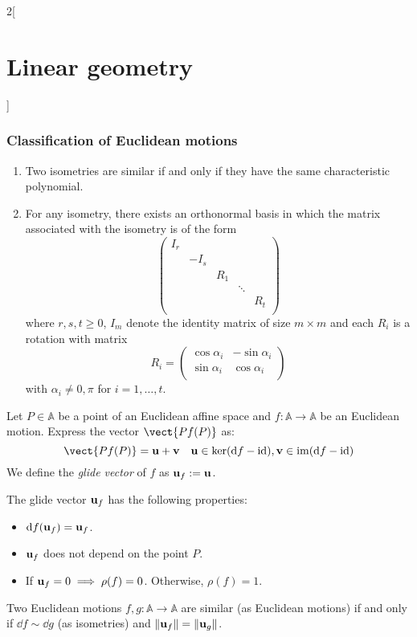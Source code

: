 \documentclass[../../../main.tex]{subfiles}
\begin{document}
\begin{multicols}{2}[\section{Linear geometry}]
  \subsubsection{Classification of Euclidean motions}
  \begin{theorem}
    \hfill
    \begin{enumerate}
      \item Two isometries are similar if and only if they have the same characteristic polynomial.
      \item For any isometry, there exists an orthonormal basis in which the matrix associated with the isometry is of the form  $$\begin{pmatrix}
                I_r &      &     &        &     \\
                    & -I_s &     &        &     \\
                    &      & R_1 &        &     \\
                    &      &     & \ddots &     \\
                    &      &     &        & R_t \\
              \end{pmatrix}$$ where $r,s,t\geq 0$, $I_m$ denote the identity matrix of size $m\times m$ and each $R_i$ is a rotation with matrix $$R_i=\begin{pmatrix}
                \cos\alpha_i & -\sin\alpha_i \\
                \sin\alpha_i & \cos\alpha_i  \\
              \end{pmatrix}$$ with $\alpha_i\ne0,\pi$ for $i=1,\ldots,t$.
    \end{enumerate}
  \end{theorem}
  \begin{definition}
    Let $P\in\mathbb{A}$ be a point of an Euclidean affine space and $f:\mathbb{A}\rightarrow\mathbb{A}$ be an Euclidean motion. Express the vector $\vect{Pf(P)}$ as: $$\vect{Pf(P)}=\vf{u}+\vf{v}\quad\vf{u}\in\ker(\dd{f}-\id),\vf{v}\in\im(\dd{f}-\id)$$ We define the \emph{glide vector} of $f$ as $\boldsymbol{\mathrm{u}}_f:=\boldsymbol{\mathrm{u}}$.
  \end{definition}
  \begin{proposition}
    The glide vector $\boldsymbol{\mathrm{u}}_f$ has the following properties:
    \begin{itemize}
      \item $\dd{f(\boldsymbol{\mathrm{u}}_f)}=\boldsymbol{\mathrm{u}}_f$.
      \item $\boldsymbol{\mathrm{u}}_f$ does not depend on the point $P$.
      \item If $\boldsymbol{\mathrm{u}}_f=0\implies\rho(f)=0$. Otherwise, $\rho(f)=1$.
    \end{itemize}
  \end{proposition}
  \begin{theorem}
    Two Euclidean motions $f,g:\mathbb{A}\rightarrow\mathbb{A}$ are similar (as Euclidean motions) if and only if $\dd{f}\sim \dd{g}$ (as isometries) and $\|\boldsymbol{\mathrm{u}}_f\|=\|\boldsymbol{\mathrm{u}}_g\|$.
  \end{theorem}

\end{multicols}
\end{document}
